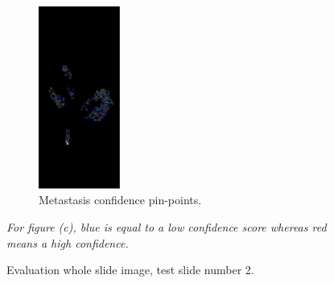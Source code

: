 \documentclass[a4paper,10pt,twocolumn]{article}
\begin{document}
\begin{figure}[!ht]
\begin{subfigure}{.33\textwidth}
  \centering
  \includegraphics[height=6cm]{Detection.png}
  \caption{Metastasis confidence pin-points.}
  \label{Detecting maxima}
\end{subfigure}
\textit{For figure (c), blue is equal to a low confidence score whereas red means a high confidence.}
\caption{Evaluation whole slide image, test slide number 2.}
\label{fig:output}
\end{figure}
\end{document}
